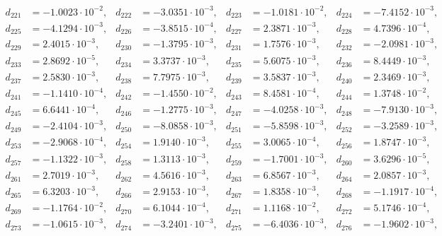 \begin{align*}
d_{ 221 } &= -1.0023 \cdot 10^{ -2 }, & d_{ 222 } &= -3.0351 \cdot 10^{ -3 }, & d_{ 223 } &= -1.0181 \cdot 10^{ -2 }, & d_{ 224 } &= -7.4152 \cdot 10^{ -3 },\\ 
d_{ 225 } &= -4.1294 \cdot 10^{ -3 }, & d_{ 226 } &= -3.8515 \cdot 10^{ -4 }, & d_{ 227 } &= 2.3871 \cdot 10^{ -3 }, & d_{ 228 } &= 4.7396 \cdot 10^{ -4 },\\ 
d_{ 229 } &= 2.4015 \cdot 10^{ -3 }, & d_{ 230 } &= -1.3795 \cdot 10^{ -3 }, & d_{ 231 } &= 1.7576 \cdot 10^{ -3 }, & d_{ 232 } &= -2.0981 \cdot 10^{ -3 },\\ 
d_{ 233 } &= 2.8692 \cdot 10^{ -5 }, & d_{ 234 } &= 3.3737 \cdot 10^{ -3 }, & d_{ 235 } &= 5.6075 \cdot 10^{ -3 }, & d_{ 236 } &= 8.4449 \cdot 10^{ -3 },\\ 
d_{ 237 } &= 2.5830 \cdot 10^{ -3 }, & d_{ 238 } &= 7.7975 \cdot 10^{ -3 }, & d_{ 239 } &= 3.5837 \cdot 10^{ -3 }, & d_{ 240 } &= 2.3469 \cdot 10^{ -3 },\\ 
d_{ 241 } &= -1.1410 \cdot 10^{ -4 }, & d_{ 242 } &= -1.4550 \cdot 10^{ -2 }, & d_{ 243 } &= 8.4581 \cdot 10^{ -4 }, & d_{ 244 } &= 1.3748 \cdot 10^{ -2 },\\ 
d_{ 245 } &= 6.6441 \cdot 10^{ -4 }, & d_{ 246 } &= -1.2775 \cdot 10^{ -3 }, & d_{ 247 } &= -4.0258 \cdot 10^{ -3 }, & d_{ 248 } &= -7.9130 \cdot 10^{ -3 },\\ 
d_{ 249 } &= -2.4104 \cdot 10^{ -3 }, & d_{ 250 } &= -8.0858 \cdot 10^{ -3 }, & d_{ 251 } &= -5.8598 \cdot 10^{ -3 }, & d_{ 252 } &= -3.2589 \cdot 10^{ -3 },\\ 
d_{ 253 } &= -2.9068 \cdot 10^{ -4 }, & d_{ 254 } &= 1.9140 \cdot 10^{ -3 }, & d_{ 255 } &= 3.0065 \cdot 10^{ -4 }, & d_{ 256 } &= 1.8747 \cdot 10^{ -3 },\\ 
d_{ 257 } &= -1.1322 \cdot 10^{ -3 }, & d_{ 258 } &= 1.3113 \cdot 10^{ -3 }, & d_{ 259 } &= -1.7001 \cdot 10^{ -3 }, & d_{ 260 } &= 3.6296 \cdot 10^{ -5 },\\ 
d_{ 261 } &= 2.7019 \cdot 10^{ -3 }, & d_{ 262 } &= 4.5616 \cdot 10^{ -3 }, & d_{ 263 } &= 6.8567 \cdot 10^{ -3 }, & d_{ 264 } &= 2.0857 \cdot 10^{ -3 },\\ 
d_{ 265 } &= 6.3203 \cdot 10^{ -3 }, & d_{ 266 } &= 2.9153 \cdot 10^{ -3 }, & d_{ 267 } &= 1.8358 \cdot 10^{ -3 }, & d_{ 268 } &= -1.1917 \cdot 10^{ -4 },\\ 
d_{ 269 } &= -1.1764 \cdot 10^{ -2 }, & d_{ 270 } &= 6.1044 \cdot 10^{ -4 }, & d_{ 271 } &= 1.1168 \cdot 10^{ -2 }, & d_{ 272 } &= 5.1746 \cdot 10^{ -4 },\\ 
d_{ 273 } &= -1.0615 \cdot 10^{ -3 }, & d_{ 274 } &= -3.2401 \cdot 10^{ -3 }, & d_{ 275 } &= -6.4036 \cdot 10^{ -3 }, & d_{ 276 } &= -1.9602 \cdot 10^{ -3 },\\ 

\end{align*}
